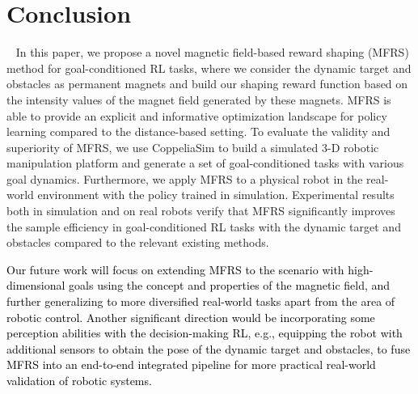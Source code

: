 \documentclass[journal]{IEEEtran}
\begin{document}
\section{Conclusion}~\label{conclusion}
In this paper, we propose a novel magnetic field-based reward shaping (MFRS) method for goal-conditioned RL tasks, where we consider the dynamic target and obstacles as permanent magnets and build our shaping reward function based on the intensity values of the magnet field generated by these magnets. MFRS is able to provide an explicit and informative optimization landscape for policy learning compared to the distance-based setting.
To evaluate the validity and superiority of MFRS, we use CoppeliaSim to build a simulated 3-D robotic manipulation platform and generate a set of goal-conditioned tasks with various goal dynamics.
Furthermore, we apply MFRS to a physical robot in the real-world environment with the policy trained in simulation.
Experimental results both in simulation and on real robots verify that MFRS significantly improves the sample efficiency in goal-conditioned RL tasks with the dynamic target and obstacles compared to the relevant existing methods.

\textcolor{black}{Our future work will focus on extending MFRS to the scenario with high-dimensional goals using the concept and properties of the magnetic field, and further generalizing to more diversified real-world tasks apart from the area of robotic control.
Another significant direction would be incorporating some perception abilities with the decision-making RL, e.g., equipping the robot with additional sensors to obtain the pose of the dynamic target and obstacles, to fuse MFRS into an end-to-end integrated pipeline for more practical real-world validation of robotic systems.}
\end{document}
